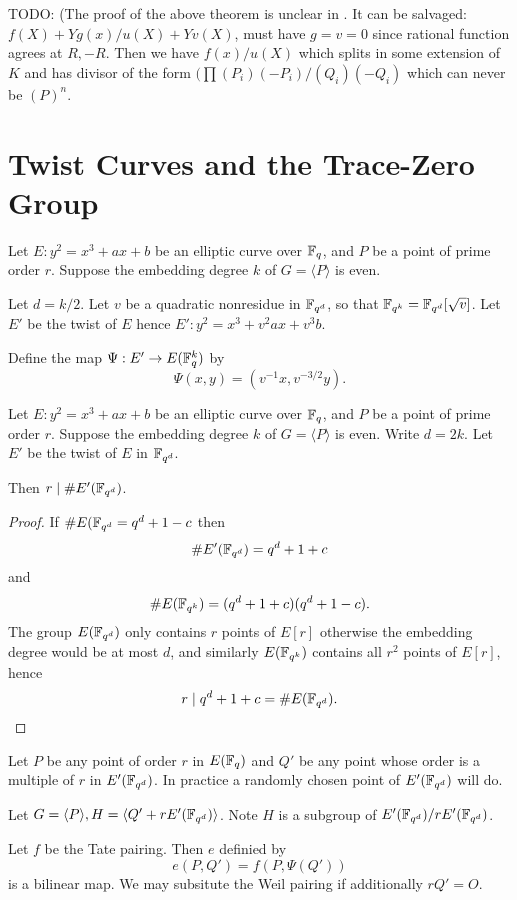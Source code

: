 TODO:
(The proof of the above theorem is unclear in \cite{barreto}.
It can be salvaged: $f(X) + Y g(x) / u(X) + Y v(X)$, must have $g = v = 0$
since rational function agrees at $R, -R$. Then we have $f(x) / u(X)$
which splits in some extension of $K$ and
has divisor of the form $(\prod (P_i)(-P_i) / (Q_i)(-Q_i)$ which can
never be $(P)^n$.

\section {Twist Curves and the Trace-Zero Group}

Let $E : y^2 = x^3 + a x + b$ be an elliptic curve over $\mathbb{F}_q$,
and $P$ be a point of prime order $r$.
Suppose the embedding degree $k$ of $G = \langle P \rangle$ is even.

Let $d = k / 2$. Let $v$ be a quadratic nonresidue in $\mathbb{F}_{q^d}$,
so that $\mathbb{F}_{q^k} = \mathbb{F}_{q^d}[\sqrt{v}]$.
Let $E'$ be the twist of $E$ hence
$E' : y^2 = x^3 + v^2 a x + v^3 b$.

Define the map $\Psi:E'\rightarrow E(\mathbb{F}_q^k)$ by
\[ \Psi(x,y) = (v^{-1}x, v^{-3/2}y) . \]

\begin{theorem}
Let $E : y^2 = x^3 + a x + b$ be an elliptic curve over $\mathbb{F}_q$,
and $P$ be a point of prime order $r$.
Suppose the embedding degree $k$ of $G = \langle P \rangle$ is even.
Write $d = 2k$. Let $E'$ be the twist of $E$ in $\mathbb{F}_{q^d}$.

Then $r \mid \#E'(\mathbb{F}_{q^d})$.
\end{theorem}

\begin{proof}
If $\#E(\mathbb{F}_{q^d} = q^d + 1 - c$ then
\[ \#E'(\mathbb{F}_{q^d}) = q^d + 1 + c \]
and
\[ \#E(\mathbb{F}_{q^k}) = (q^{d} + 1 + c)(q^{d} + 1 - c) . \]
The group $E(\mathbb{F}_{q^d})$ only contains $r$ points of $E[r]$ otherwise
the embedding degree would be at most $d$, and similarly
$E(\mathbb{F}_{q^k})$ contains all $r^2$ points of $E[r]$,
hence
\[ r \mid q^{d} + 1 + c = \#E(\mathbb{F}_{q^d}) .\]
\end{proof}

Let $P$ be any point of order $r$ in $E(\mathbb{F}_q)$ and
$Q'$ be any point whose order is a multiple of $r$ in $E'(\mathbb{F}_{q^d})$.
In practice a randomly chosen point of $E'(\mathbb{F}_{q^d})$ will do.

Let $G = \langle P \rangle, H = \langle Q' + r E'(\mathbb{F}_{q^d}) \rangle$.
Note $H$ is a subgroup of $E'(\mathbb{F}_{q^d}) / rE'(\mathbb{F}_{q^d})$.

Let $f$ be the Tate pairing.
Then $e$ definied by
\[e(P,Q') = f(P, \Psi(Q')) \]
is a bilinear map.
We may subsitute the Weil pairing if additionally
$r Q' = O$.

